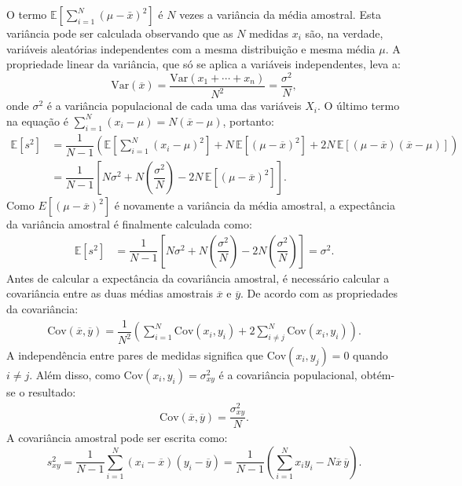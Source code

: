 O termo $\mathbb{E}[\textstyle\sum_{i=1}^{N} (\mu - \bar{x})^2]$ é $N$ vezes a variância da média amostral. Esta variância pode ser calculada observando que as $N$ medidas $x_i$ são, na verdade, variáveis aleatórias independentes com a mesma distribuição e mesma média $\mu$. A propriedade linear da variância, que só se aplica a variáveis independentes, leva a:
\begin{equation*}
\text{Var}(\overline{x}) = \dfrac{\text{Var}(x_1 + \cdots + x_n)}{N^2} = \frac{\sigma^2}{N},
\end{equation*}
onde $\sigma^2$ é a variância populacional de cada uma das variáveis $X_i$. O último termo na equação é $\textstyle\sum_{i=1}^{N} (x_i - \mu) = N (\overline{x} - \mu)$, portanto:
\begin{align*}
\mathbb{E}[s^2] &= \dfrac{1}{N -1}\left(\mathbb{E}\left[\sum_{i=1}^N(x_i - \mu)^2\right] + N\,\mathbb{E}\left[(\mu - \overline{x})^2\right] + 2N\,\mathbb{E}\left[(\mu - \overline{x})(\overline{x} - \mu)\right]\right) \\
&= \dfrac{1}{N -1}\left[N\sigma^2 + N\left(\dfrac{\sigma^2}{N}\right) - 2N\,\mathbb{E}\left[(\mu - \overline{x})^2\right]\right].
\end{align*}
Como $E[(\mu - \overline{x})^2]$ é novamente a variância da média amostral, a expectância da variância amostral é finalmente calculada como:
\begin{align*}
	\mathbb{E}[s^2] &= \dfrac{1}{N -1}\left[N\sigma^2 + N\left(\dfrac{\sigma^2}{N}\right) - 2N\left(\dfrac{\sigma^2}{N}\right)\right] = \sigma^2.
\end{align*}
Antes de calcular a expectância da covariância amostral, é necessário calcular a covariância entre as duas médias amostrais $\overline x$ e $\overline y$. De acordo com as propriedades da covariância:
\begin{align*}
 \text{Cov}(\overline x, \overline y) = \dfrac{1}{N^2}\left(\sum_{i=1}^{N}\text{Cov}(x_i,y_i) + 2 \sum_{i\neq j}^{N}\text{Cov}(x_i,y_i)\right).
\end{align*}
A independência entre pares de medidas significa que $\text{Cov}(x_i, y_j) = 0$ quando $i \neq j$. Além disso, como $\text{Cov}(x_i, y_i) = \sigma_{xy}^2$ é a covariância populacional, obtém-se o resultado:
\begin{align*}
\text{Cov}(\overline{x},\overline{y}) = \dfrac{\sigma_{xy}^2}{N}.
\end{align*}
A covariância amostral pode ser escrita como:
\begin{equation*}
s_{xy}^2 = \dfrac{1}{N-1}\sum_{i=1}^{N}(x_i - \overline{x})(y_i - \overline{y}) = \dfrac{1}{N-1} \left( \sum_{i=1}^{N} x_i y_i - N\overline{x}\,\overline{y}\right).
\end{equation*}
